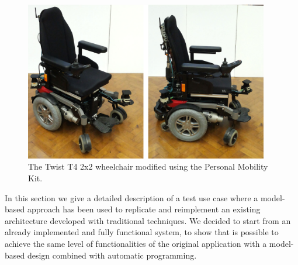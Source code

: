 \begin{figure}[t]
\centering
\includegraphics[width=0.95\textwidth]{gfx/pmk/pmk_plat}
\caption{The Twist T4 2x2 wheelchair modified using the Personal Mobility Kit.}
\label{fig:pmk}
\end{figure}

In this section we give a detailed description of a test use case where a model-based approach has been used to replicate and reimplement an existing architecture developed with traditional techniques. We decided to start from an already implemented and fully functional system, to show that is possible to achieve the same level of functionalities of the original application with a model-based design combined with automatic programming.

